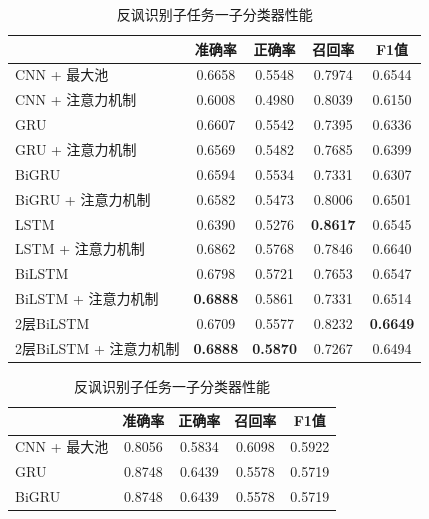 \begin{table}[htb]
  \centering
  \begin{minipage}[t]{0.8\linewidth}
  \caption{反讽识别子任务一子分类器性能}
  \label{tab:exp_irony_det_A_single_result}
    \begin{tabularx}{\linewidth}{X|cccc}
    \toprule[1.5pt]
    & 准确率 & 正确率 & 召回率 & F1值 \\
    \hline
    CNN + 最大池 & 0.6658 & 0.5548 & 0.7974 & 0.6544 \\ %
    CNN + 注意力机制 & 0.6008 & 0.4980 & 0.8039 & 0.6150 \\  %
    \hline
    GRU & 0.6607 & 0.5542 & 0.7395 & 0.6336 \\ %
    GRU + 注意力机制 & 0.6569 & 0.5482 & 0.7685 & 0.6399 \\ %
    \hline
    BiGRU & 0.6594 & 0.5534 & 0.7331 & 0.6307 \\ %
    BiGRU + 注意力机制 & 0.6582 & 0.5473 & 0.8006 & 0.6501 \\ %
    \hline
    LSTM & 0.6390 & 0.5276 & \bf 0.8617 & 0.6545 \\ %
    LSTM + 注意力机制 & 0.6862 & 0.5768 & 0.7846 & 0.6640 \\ %
    \hline
    BiLSTM & 0.6798 & 0.5721 & 0.7653 & 0.6547 \\ %
    BiLSTM + 注意力机制 & \bf 0.6888 & 0.5861 & 0.7331 & 0.6514 \\ %
    2层BiLSTM & 0.6709 & 0.5577 & 0.8232 & \bf 0.6649 \\ %
    2层BiLSTM + 注意力机制 & \bf 0.6888 & \bf 0.5870 & 0.7267 & 0.6494 \\ %
    \bottomrule[1.5pt]
    \end{tabularx}
  \end{minipage}
\end{table}

\begin{table}[htb]
  \centering
  \begin{minipage}[t]{0.8\linewidth}
  \caption{反讽识别子任务一子分类器性能}
  \label{tab:exp_irony_det_B0_single_result}
    \begin{tabularx}{\linewidth}{X|cccc}
    \toprule[1.5pt]
    & 准确率 & 正确率 & 召回率 & F1值 \\
    \hline
    CNN + 最大池 & 0.8056 & 0.5834 & 0.6098 & 0.5922 \\ %

    \hline


    GRU & 0.8748 & 0.6439 & 0.5578 & 0.5719 \\ %
    \hline

    BiGRU & 0.8748 & 0.6439 & 0.5578 & 0.5719 \\ %
    \bottomrule[1.5pt]
    \end{tabularx}
  \end{minipage}
\end{table}


